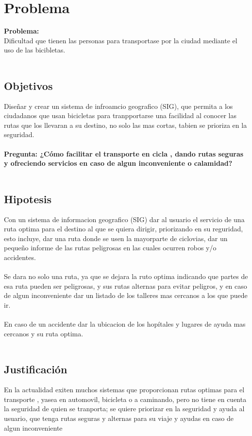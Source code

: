\chapter{Problema}


\textbf{Problema:}
\\
Dificultad que tienen las personas para transportase por la ciudad mediante el uso de las bicibletas.
\\
\\
\section{Objetivos}

Diseñar y crear un sistema de infroamcio geografico (SIG), que permita a los ciudadanos que usan bicicletas para tranpportarse una facilidad al conocer las rutas que los llevaran a su destino, no solo las mas cortas, tabien se prioriza en la seguridad.
\\
\\
\textbf{Pregunta: ¿Cómo facilitar el transporte en cicla , dando rutas seguras y ofreciendo servicios en caso de algun inconveniente o calamidad?}
\\
\\
\section{Hipotesis}

Con un sistema de informacion geografico (SIG) dar al usuario el servicio de una ruta optima para el destino al que se quiera dirigir, priorizando en su reguridad, esto incluye, dar una ruta donde se usen la mayorparte de ciclovias, dar un pequeño informe de las rutas peligrosas en las cuales ocurren robos y/o accidentes.
\\
\\
Se dara no solo una ruta, ya que se dejara la ruto optima indicando que partes de esa ruta pueden ser peligrosas, y sus rutas alternas para evitar peligros, y en caso de algun inconveniente dar un listado de los talleres mas cercanos a los que puede ir.\\
\\
En caso de un accidente dar la ubicacion de los hopítales y lugares de ayuda mas cercanos y su ruta optima.
\\
\\
\vfill
\section{Justificación}

En la actualidad exiten muchos sistemas que proporcionan rutas optimas para el transporte , yasea en automovil, bicicleta o a caminando, pero no tiene en cuenta la seguridad de quien se tranporta; se quiere priorizar en la seguridad y ayuda al usuario, que tenga rutas seguras y alternas para su viaje y ayudas en caso de algun inconveniente 



        
